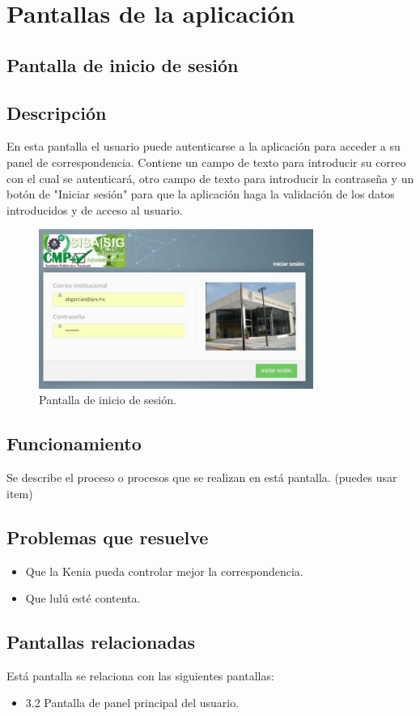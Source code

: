 \section{Pantallas de la aplicación}

\subsection{Pantalla de inicio de sesión}

\subsection{Descripción}
En esta pantalla el usuario puede autenticarse a la aplicación para acceder a su panel de correspondencia. Contiene un campo de texto para introducir su correo con el cual se autenticará, otro campo de texto para introducir la contraseña y un botón de "Iniciar sesión" para que la aplicación haga la validación de los datos introducidos y de acceso al usuario.

	\begin{figure}[htbp!]
		\centering
			\includegraphics[width=0.8\textwidth]{Pantallas/iniciodesesion}
		\caption{Pantalla de inicio de sesión.}
	\end{figure}

\subsection{Funcionamiento}
Se describe el proceso o procesos que se realizan en está pantalla. (puedes usar item)
\subsection{Problemas que resuelve}
	\begin{itemize}
		\item Que la Kenia pueda controlar mejor la correspondencia.
		\item Que lulú esté contenta.
	\end{itemize}

\subsection{Pantallas relacionadas}
Está pantalla se relaciona con las siguientes pantallas:
	\begin{itemize}
		\item 3.2 Pantalla de panel principal del usuario.
	\end{itemize}